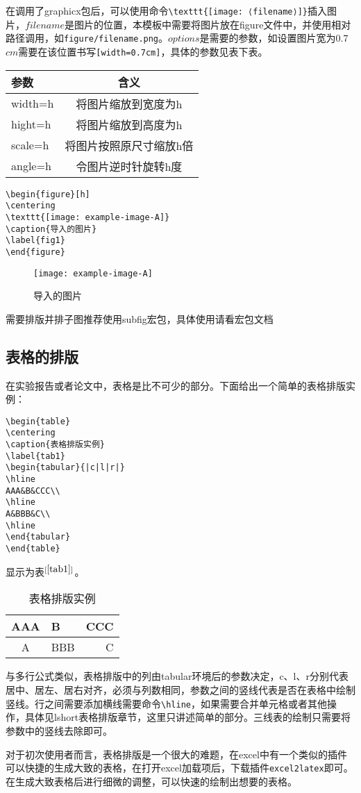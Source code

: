 在调用了graphicx包后，可以使用命令\verb|\texttt{[image: ⟨filename⟩]}|插入图片，$filename$是图片的位置，本模板中需要将图片放在figure文件中，并使用相对路径调用，如\verb|figure/filename.png|。$options$是需要的参数，如设置图片宽为0.7$cm$需要在该位置书写\verb|[width=0.7cm]|，具体的参数见表下表。
\begin{table}[h]
\centering
\begin{tabular}{lc}
\hline
参数&含义\\
\hline
width=h&将图片缩放到宽度为h\\
hight=h&将图片缩放到高度为h\\
scale=h&将图片按照原尺寸缩放h倍\\
angle=h&令图片逆时针旋转h度\\
\hline
\end{tabular}
\label{table1}
\end{table}

\begin{verbatim}
\begin{figure}[h]
\centering
\texttt{[image: example-image-A]}
\caption{导入的图片}
\label{fig1}
\end{figure}
\end{verbatim}
\begin{figure}[h]
\centering
\texttt{[image: example-image-A]}
\caption{导入的图片}
\label{fig1}
\end{figure}
需要排版并排子图推荐使用subfig宏包，具体使用请看宏包文档
\subsection{表格的排版}
在实验报告或者论文中，表格是比不可少的部分。下面给出一个简单的表格排版实例：
\begin{verbatim}
\begin{table}
\centering
\caption{表格排版实例}
\label{tab1}
\begin{tabular}{|c|l|r|}
\hline
AAA&B&CCC\\
\hline
A&BBB&C\\
\hline
\end{tabular}
\end{table}
\end{verbatim}

显示为表$^{[\ref{tab1}]}$。
\begin{table}[h]
\centering
\caption{表格排版实例}
\label{tab1}
\begin{tabular}{|c|l|r|}
\hline
AAA&B&CCC\\
\hline
A&BBB&C\\
\hline
\end{tabular}
\end{table}
与多行公式类似，表格排版中的列由tabular环境后的参数决定，c、l、r分别代表居中、居左、居右对齐，必须与列数相同，参数之间的竖线代表是否在表格中绘制竖线。行之间需要添加横线需要命令\verb|\hline|，如果需要合并单元格或者其他操作，具体见lshort表格排版章节，这里只讲述简单的部分。三线表的绘制只需要将参数中的竖线去除即可。

对于初次使用者而言，表格排版是一个很大的难题，在excel中有一个类似的插件可以快捷的生成大致的表格，在打开excel加载项后，下载插件\verb|excel2latex|即可。在生成大致表格后进行细微的调整，可以快速的绘制出想要的表格。